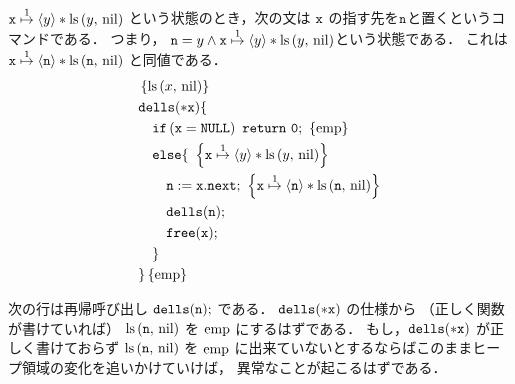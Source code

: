 \documentclass[a4paper, 10pt]{ltjsarticle}
\begin{document}
  $ \mathtt{x} \mathrel{\overset{1}{\mapsto}} \left\langle y \right\rangle * \mathop{\mathrm{ls}}\left(y{,}\ \mathrm{nil}\right)$
  という状態のとき，次の文は $\mathtt{x}$ の指す先を$\mathtt{n}$と置くというコマンドである．
  つまり，
  $\mathtt{n}=y \land  \mathtt{x} \mathrel{\overset{1}{\mapsto}} \left\langle y \right\rangle * \mathop{\mathrm{ls}}\left(y{,}\ \mathrm{nil}\right)$という状態である．
  これは
  $ \mathtt{x} \mathrel{\overset{1}{\mapsto}} \left\langle \mathtt{n} \right\rangle * \mathop{\mathrm{ls}}\left(\mathtt{n}{,}\ \mathrm{nil}\right)$
  と同値である．
    \begin{align*}
   &  \left\{\mathprls{x}{\mathvalnil}\right\}\\
   & \mathprogramsy{dells(*x)} \{  \\
   &\quad \mathprogramsy{if\left(x = NULL\right)\ return\ 0;}\ \left\{\mathemp\right\}
   \\
     &\quad   \mathprogramsy{else \{}\  
   \left\{ \mathprogramsy{x} \mathpointer{1} \left\langle y \right\rangle * \mathprls{y}{\mathvalnil}  \right\} \\
     &\qquad  \mathprogramsy{n := x.next;}\  \left\{ \mathprogramsy{x} \mathpointer{1} \left\langle \mathprogramsy{n} \right\rangle * \mathprls{\mathprogramsy{n}}{\mathvalnil}  \right\} \\
     &\qquad  \mathprogramsy{dells(n);}  %
   \\
      &\qquad  \mathprogramsy{free(x);}   %
   \\
      &\quad \mathprogramsy{\}} %
   \\
      &\mathprogramsy{\}} \left\{\mathemp\right\}
    \end{align*}
  
  次の行は再帰呼び出し $\mathtt{dells(n);}$
  である．
  $\mathtt{dells(*x)}$ の仕様から
  （正しく関数が書けていれば）
  $\mathop{\mathrm{ls}}\left(\mathtt{n}{,}\ \mathrm{nil}\right)$ を
  $\mathrm{emp}$ にするはずである．
  もし，$\mathtt{dells(*x)}$ が正しく書けておらず
  $\mathop{\mathrm{ls}}\left(\mathtt{n}{,}\ \mathrm{nil}\right)$ を
  $\mathrm{emp}$ に出来ていないとするならばこのままヒープ領域の変化を追いかけていけば，
  異常なことが起こるはずである．
\end{document}
